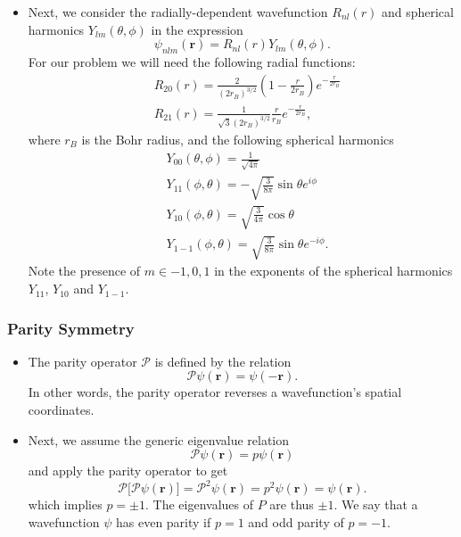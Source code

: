 \documentclass[11pt, a4paper]{article}
\renewcommand{\vec}[1]{\bm{#1}} %
\newcommand{\p}{\psi}  %
\renewcommand{\r}{\vec{r}}  %
\renewcommand{\P}{\mathcal{P}}  %
\begin{document}
\begin{itemize}
	\item Next, we consider the radially-dependent wavefunction $ R_{nl}(r) $ and spherical harmonics $ Y_{lm}(\theta, \phi) $ in the expression
	\begin{equation*}
		\p_{nlm}(\r) = R_{nl}(r) Y_{lm}(\theta, \phi).
	\end{equation*}
	For our problem we will need the following radial functions:
	\begin{align*}
		& R_{20}(r) = \frac{2}{(2r_{B})^{3/2}}\left(1 - \frac{r}{2r_{B}}\right)e^{-\frac{r}{2r_{B}}}\\
		& R_{21}(r) = \frac{1}{\sqrt{3}(2r_{B})^{3/2}}\frac{r}{r_{B}}e^{-\frac{r}{2r_{B}}},
	\end{align*}
	where $ r_{B} $ is the Bohr radius, and the following spherical harmonics
	\begin{align*}
		& Y_{00}(\theta, \phi) = \frac{1}{\sqrt{4\pi}}	\\
		& Y_{11}(\phi, \theta) = - \sqrt{\frac{3}{8\pi}}\sin \theta e^{i \phi}	\\
		& Y_{10}(\phi, \theta) = \sqrt{\frac{3}{4\pi}}\cos \theta	\\
		& Y_{1-1}(\phi, \theta)	 = \sqrt{\frac{3}{8\pi}}\sin \theta e^{-i\phi}.
	\end{align*}
	Note the presence of $ m \in {-1, 0, 1} $ in the exponents of the spherical harmonics $ Y_{11} $, $ Y_{10} $ and $ Y_{1-1} $.
\end{itemize}


\subsubsection{Parity Symmetry}
\begin{itemize}
	\item The parity operator $ \P $ is defined by the relation
	\begin{equation*}
		\P \p(\r) = \p(-\r).
	\end{equation*}
	In other words, the parity operator reverses a wavefunction's spatial coordinates. 
	
	\item Next, we assume the generic eigenvalue relation
	\begin{equation*}
		\P\p(\r) = p \p(\r)
	\end{equation*}
	and apply the parity operator to get
	\begin{equation*}
		\P \big[\P\p(\r)\big] = \P^{2}\p(\r) = p^{2} \p(\r) = \p(\r).
	\end{equation*}
	which implies $ p = \pm 1 $. The eigenvalues of $ P $ are thus $ \pm 1 $. We say that a wavefunction $ \p $ has even parity if $ p = 1 $ and odd parity of $ p = - 1 $. 
\end{itemize}
\end{document}
